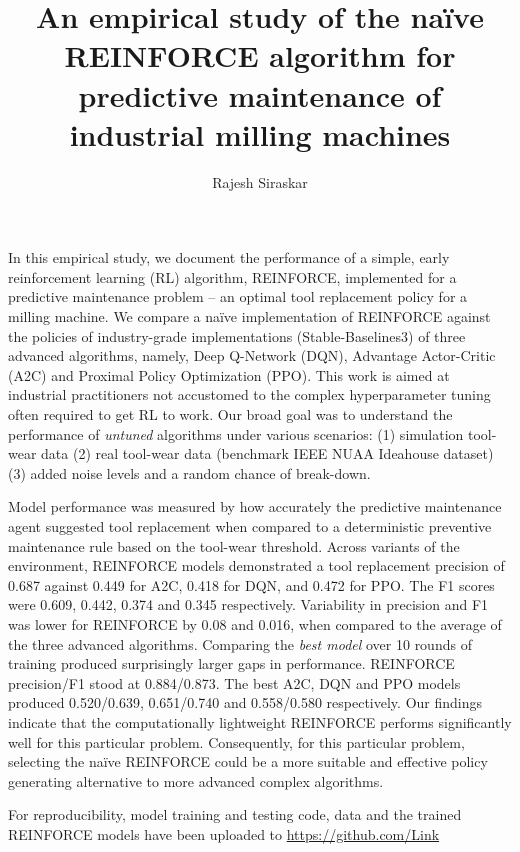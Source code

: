 \documentclass[a4paper, 12pt]{article}
\title{An empirical study of the na\"ive REINFORCE algorithm for predictive maintenance of industrial milling machines}
\author{Rajesh Siraskar}
\renewenvironment{abstract}
{\small
	\begin{center}
		\bfseries \abstractname\vspace{-.5em}\vspace{0pt}
	\end{center}
	\list{}{
		\setlength{\leftmargin}{.25cm}%
		\setlength{\rightmargin}{\leftmargin}%
	}%
	\item\relax}
{\endlist}
\begin{document}
\maketitle

\begin{abstract}
In this empirical study, we document the performance of a simple, early reinforcement learning (RL) algorithm, REINFORCE, implemented for a predictive maintenance problem -- an optimal tool replacement policy for a milling machine. We compare a na\"ive implementation of REINFORCE against the policies of industry-grade implementations (Stable-Baselines3) of three advanced algorithms, namely, Deep Q-Network (DQN), Advantage Actor-Critic (A2C) and Proximal Policy Optimization (PPO). This work is aimed at industrial practitioners not accustomed to the complex hyperparameter tuning often required to get RL to work. Our broad goal was to understand the performance of \textit{untuned} algorithms under various scenarios: (1) simulation tool-wear data (2) real tool-wear data (benchmark IEEE NUAA Ideahouse dataset) (3) added noise levels and a random chance of break-down. 

Model performance was measured by how accurately the predictive maintenance agent suggested tool replacement when compared to a deterministic preventive maintenance rule based on the tool-wear threshold. Across variants of the environment, REINFORCE models demonstrated a tool replacement precision of 0.687 against 0.449 for A2C, 0.418 for DQN, and 0.472 for PPO. The F1 scores were 0.609, 0.442, 0.374 and 0.345 respectively. Variability in precision and F1 was lower for REINFORCE by 0.08 and 0.016, when compared to the average of the three advanced algorithms. Comparing the \textit{best model} over 10 rounds of training produced surprisingly larger gaps in performance. REINFORCE precision/F1 stood at 0.884/0.873. The best A2C, DQN and PPO models produced 0.520/0.639, 0.651/0.740 and 0.558/0.580 respectively. Our findings indicate that the computationally lightweight REINFORCE performs significantly well for this particular problem. Consequently, for this particular problem, selecting the na\"ive REINFORCE could be a more suitable and effective policy generating alternative to more advanced complex algorithms. 

For reproducibility, model training and testing code, data and the trained REINFORCE models have been uploaded to \href{https://github.com/Rajesh-Siraskar/Empirical-Study\_REINFORCE-for-predictive-maintenance}{https://github.com/Link} 
\end{abstract}
\end{document}
